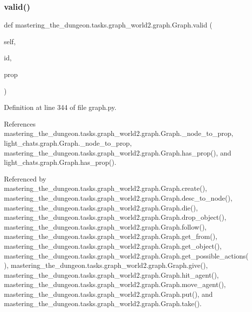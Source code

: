 \subsubsection{\texorpdfstring{valid()}{valid()}}
{\footnotesize\ttfamily def mastering\+\_\+the\+\_\+dungeon.\+tasks.\+graph\+\_\+world2.\+graph.\+Graph.\+valid (\begin{DoxyParamCaption}\item[{}]{self,  }\item[{}]{id,  }\item[{}]{prop }\end{DoxyParamCaption})}



Definition at line 344 of file graph.\+py.



References mastering\+\_\+the\+\_\+dungeon.\+tasks.\+graph\+\_\+world2.\+graph.\+Graph.\+\_\+node\+\_\+to\+\_\+prop, light\+\_\+chats.\+graph.\+Graph.\+\_\+node\+\_\+to\+\_\+prop, mastering\+\_\+the\+\_\+dungeon.\+tasks.\+graph\+\_\+world2.\+graph.\+Graph.\+has\+\_\+prop(), and light\+\_\+chats.\+graph.\+Graph.\+has\+\_\+prop().



Referenced by mastering\+\_\+the\+\_\+dungeon.\+tasks.\+graph\+\_\+world2.\+graph.\+Graph.\+create(), mastering\+\_\+the\+\_\+dungeon.\+tasks.\+graph\+\_\+world2.\+graph.\+Graph.\+desc\+\_\+to\+\_\+node(), mastering\+\_\+the\+\_\+dungeon.\+tasks.\+graph\+\_\+world2.\+graph.\+Graph.\+die(), mastering\+\_\+the\+\_\+dungeon.\+tasks.\+graph\+\_\+world2.\+graph.\+Graph.\+drop\+\_\+object(), mastering\+\_\+the\+\_\+dungeon.\+tasks.\+graph\+\_\+world2.\+graph.\+Graph.\+follow(), mastering\+\_\+the\+\_\+dungeon.\+tasks.\+graph\+\_\+world2.\+graph.\+Graph.\+get\+\_\+from(), mastering\+\_\+the\+\_\+dungeon.\+tasks.\+graph\+\_\+world2.\+graph.\+Graph.\+get\+\_\+object(), mastering\+\_\+the\+\_\+dungeon.\+tasks.\+graph\+\_\+world2.\+graph.\+Graph.\+get\+\_\+possible\+\_\+actions(), mastering\+\_\+the\+\_\+dungeon.\+tasks.\+graph\+\_\+world2.\+graph.\+Graph.\+give(), mastering\+\_\+the\+\_\+dungeon.\+tasks.\+graph\+\_\+world2.\+graph.\+Graph.\+hit\+\_\+agent(), mastering\+\_\+the\+\_\+dungeon.\+tasks.\+graph\+\_\+world2.\+graph.\+Graph.\+move\+\_\+agent(), mastering\+\_\+the\+\_\+dungeon.\+tasks.\+graph\+\_\+world2.\+graph.\+Graph.\+put(), and mastering\+\_\+the\+\_\+dungeon.\+tasks.\+graph\+\_\+world2.\+graph.\+Graph.\+take().

